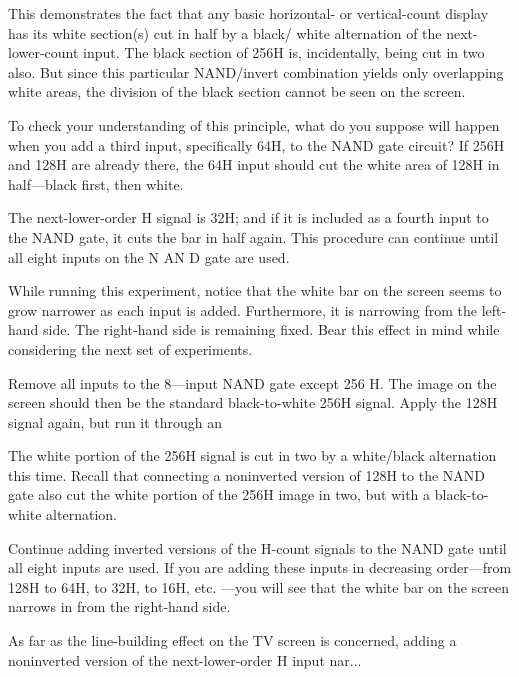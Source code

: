 \documentclass[11pt]{book}              %
\begin{document}
This demonstrates the fact that any basic horizontal- or vertical-count display has its white section(s) cut in half by a black/ white alternation of the next-lower-count input. The black section of 256H is, incidentally, being cut in two also. But since this particular NAND/invert combination yields only overlapping white areas, the division of the black section cannot be seen on the screen.

To check your understanding of this principle, what do you suppose will happen when you add a third input, specifically 64H, to the NAND gate circuit? If 256H and 128H are already there, the 64H input should cut the white area of 128H in half—black first, then white.

The next-lower-order H signal is 32H; and if it is included as a fourth input to the NAND gate, it cuts the bar in half again. This procedure can continue until all eight inputs on the N AN D gate are used.

While running this experiment, notice that the white bar on the screen seems to grow narrower as each input is added. Furthermore, it is narrowing from the left-hand side. The right-hand side is remaining fixed. Bear this effect in mind while considering the next set of experiments.

Remove all inputs to the 8—input NAND gate except 256 H. The image on the screen should then be the standard black-to-white 256H signal. Apply the 128H signal again, but run it through an 



The white portion of the 256H signal is cut in two by a white/black alternation this time. Recall that connecting a noninverted version of 128H to the NAND gate also cut the white portion of the 256H image in two, but with a black-to-white alternation.

Continue adding inverted versions of the H-count signals to the NAND gate until all eight inputs are used. If you are adding these inputs in decreasing order—from 128H to 64H, to 32H, to 16H, etc. —you will see that the white bar on the screen narrows in from the right-hand side.

As far as the line-building effect on the TV screen is concerned, adding a noninverted version of the next-lower-order H input nar... 
\end{document}
